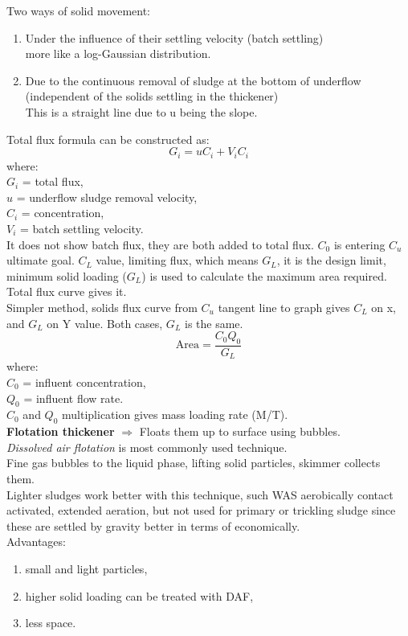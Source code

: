 \documentclass{article}
\numberwithin{equation}{section}
\begin{document}
Two ways of solid movement:
\begin{enumerate}
    \item Under the influence of their settling velocity (batch settling)\\
    more like a log-Gaussian distribution.
    \item Due to the continuous removal of sludge at the bottom of underflow (independent of the solids settling in the thickener)\\
    This is a straight line due to u being the slope.
\end{enumerate}
Total flux formula can be constructed as:
\[
G_i = uC_i + V_iC_i
\]
where:\\
$G_i$ = total flux,\\
$u$ = underflow sludge removal velocity,\\
$C_i$ = concentration,\\
$V_i$ = batch settling velocity.\\
It does not show batch flux, they are both added to total flux. $C_0$ is entering $C_u$ ultimate goal. $C_L$ value, limiting flux, which means $G_L$, it is the design limit, minimum solid loading ($G_L$) is used to calculate the maximum area required. Total flux curve gives it.\\
Simpler method, solids flux curve from $C_u$ tangent line to graph gives $C_L$ on x, and $G_L$ on Y value. Both cases, $G_L$ is the same.
\[
\text{Area} = \frac{C_0Q_0}{G_L} 
\]
where:\\
$C_0$ = influent concentration,\\
$Q_0$ = influent flow rate.\\
$C_0$ and $Q_0$ multiplication gives mass loading rate (M/T).\\
\textbf{Flotation thickener} $\Rightarrow$ Floats them up to surface using bubbles.\\
\emph{Dissolved air flotation} is most commonly used technique.\\
Fine gas bubbles to the liquid phase, lifting solid particles, skimmer collects them.\\
Lighter sludges work better with this technique, such WAS aerobically contact activated, extended aeration, but not used for primary or trickling sludge since these are settled by gravity better in terms of economically.\\
Advantages:
\begin{enumerate}
    \item small and light particles,
    \item higher solid loading can be treated with DAF,
    \item less space.
\end{enumerate}
\end{document}
